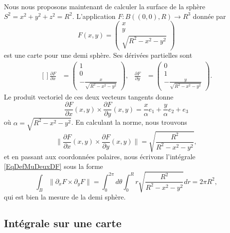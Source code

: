 Nous nous proposons maintenant de calculer la surface de la sphère $S^2=x^2+y^2+z^2=R^2$. L'application $F\colon B( (0,0),R)\to R^3$ donnée par
\begin{equation}
	F(x,y)=\begin{pmatrix}
		x	\\ 
		y	\\ 
		\sqrt{R^2-x^2-y^2}	
	\end{pmatrix}
\end{equation}
est une carte pour une demi sphère. Ses dérivées partielles sont
\begin{equation}
	\begin{aligned}[]
		\frac{ \partial F }{ \partial x }&=\begin{pmatrix}
			1	\\ 
			0	\\ 
			-\frac{ x }{ \sqrt{R^2-x^2-y^2} }	
		\end{pmatrix},
		&\frac{ \partial F }{ \partial y }&=\begin{pmatrix}
			0	\\ 
			1	\\ 
			-\frac{ y }{ \sqrt{R^2-x^2-y^2} }	
		\end{pmatrix}.
	\end{aligned}
\end{equation}
Le produit vectoriel de ces deux vecteurs tangents donne
\begin{equation}
	\frac{ \partial F }{ \partial x }(x,y)\times\frac{ \partial F }{ \partial y }(x,y)=\frac{ x }{ \alpha }e_1+\frac{ y }{ \alpha }e_2+e_3
\end{equation}
où $\alpha=\sqrt{R^2-x^2-y^2}$. En calculant la norme, nous trouvons
\begin{equation}
	\| \frac{ \partial F }{ \partial x }(x,y)\times\frac{ \partial F }{ \partial y }(x,y)\| =\sqrt{  \frac{ R^2 }{ R^2-x^2-y^2 } },
\end{equation}
et en passant aux coordonnées polaires, nous écrivons l'intégrale \eqref{EqDefMuDeuxDF} sous la forme
\begin{equation}
	\int_B\| \partial_xF\times\partial_yF \|=\int_0^{2\pi}d\theta\int_0^R r\sqrt{  \frac{ R^2 }{ R^2-x^2-y^2 } }dr=2\pi R^2,
\end{equation}
qui est bien la mesure de la demi sphère.

\subsection{Intégrale sur une carte}


